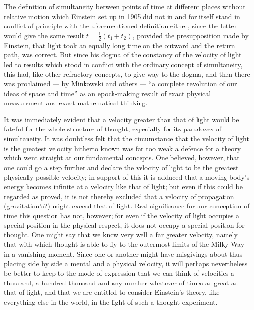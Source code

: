 \documentclass[12pt,a4paper]{article}
\begin{document}
The definition of simultaneity between points of time at different places
without relative motion which Einstein set up in 1905 did not in and for
itself stand in conflict of principle with the aforementioned definition
either, since the latter would give the same result
$t = \tfrac{1}{2}(t_{1} + t_{2})$, provided the presupposition made by
Einstein, that light took an equally long time on the outward and the return
path, was correct. But since his dogma of the constancy of the velocity of
light led to results which stood in conflict with the ordinary concept of
simultaneity, this had, like other refractory concepts, to give way to the
dogma, and then there was proclaimed --- by Minkowski and others --- ``a
complete revolution of our ideas of space and time'' as an epoch-making result
of exact physical measurement and exact mathematical thinking.

It was immediately evident that a velocity greater than that of light would be
fateful for the whole structure of thought, especially for its paradoxes of
simultaneity. It was doubtless felt that the circumstance that the velocity of
light is the greatest velocity hitherto known was far too weak a defence for a
theory which went straight at our fundamental concepts. One believed, however,
that one could go a step further and declare the velocity of light to be the
greatest physically possible velocity; in support of this it is adduced that a
moving body's energy becomes infinite at a velocity like that of light; but
even if this could be regarded as proved, it is not thereby excluded that a
velocity of propagation (gravitation's?) might exceed that of light. Real
significance for our conception of time this question has not, however; for
even if the velocity of light occupies a special position in the physical
respect, it does not occupy a special position for thought. One might say that
we know very well a far greater velocity, namely that with which
thought is able to fly to the outermost limits of the Milky Way in a vanishing
moment. Since one or another might have misgivings about thus placing side by
side a mental and a physical velocity, it will perhaps nevertheless be better
to keep to the mode of expression that we can think of velocities a thousand,
a hundred thousand and any number whatever of times as great as that of light,
and that we are entitled to consider Einstein's theory, like everything else
in the world, in the light of such a thought-experiment.
\end{document}
